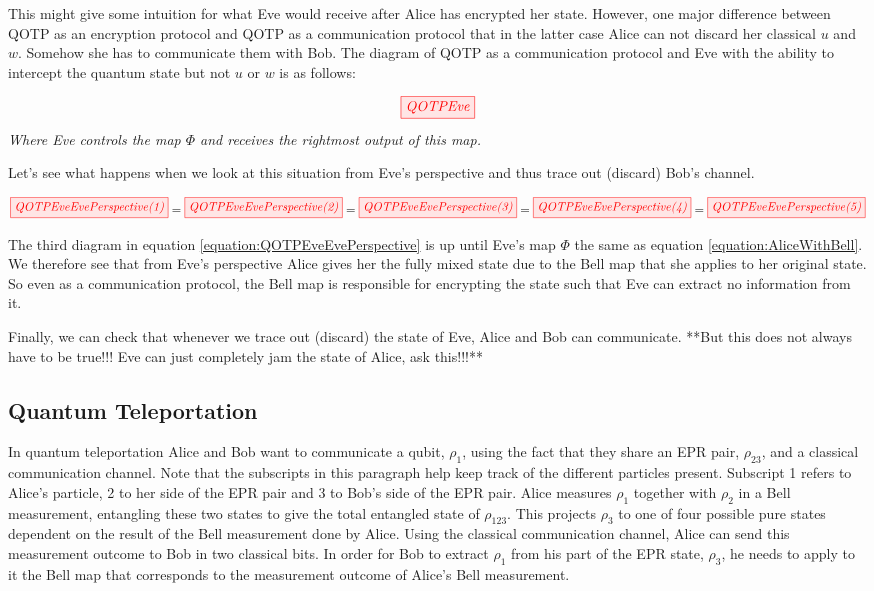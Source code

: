 \documentclass[]{article}
\begin{document}
This might give some intuition for what Eve would receive after Alice has encrypted her state. However, one major difference between QOTP as an encryption protocol and QOTP as a communication protocol that in the latter case Alice can not discard her classical $u$ and $w$. Somehow she has to communicate them with Bob. The diagram of QOTP as a communication protocol and Eve with the ability to intercept the quantum state but not $u$ or $w$ is as follows:

\begin{equation}
	\tikzfig{QOTPEve}
\end{equation}
\textit{Where Eve controls the map $\Phi$ and receives the rightmost output of this map.}

Let's see what happens when we look at this situation from Eve's perspective and thus trace out (discard) Bob's channel.

\begin{equation}
	\label{equation:QOTPEveEvePerspective}
	\tikzfig{QOTPEveEvePerspective(1)} =
	\tikzfig{QOTPEveEvePerspective(2)} =
	\tikzfig{QOTPEveEvePerspective(3)} =
	\tikzfig{QOTPEveEvePerspective(4)} =
	\tikzfig{QOTPEveEvePerspective(5)}
\end{equation}

The third diagram in equation \ref{equation:QOTPEveEvePerspective} is up until Eve's map $\Phi$ the same as equation \ref{equation:AliceWithBell}. We therefore see that from Eve's perspective Alice gives her the fully mixed state due to the Bell map that she applies to her original state. So even as a communication protocol, the Bell map is responsible for encrypting the state such that Eve can extract no information from it. 

Finally, we can check that whenever we trace out (discard) the state of Eve, Alice and Bob can communicate. **But this does not always have to be true!!! Eve can just completely jam the state of Alice, ask this!!!**

\subsection{Quantum Teleportation}

In quantum teleportation Alice and Bob want to communicate a qubit, $\rho_1$, using the fact that they share an EPR pair, $\rho_{23}$, and a classical communication channel. Note that the subscripts in this paragraph help keep track of the different particles present. Subscript 1 refers to Alice's particle, 2 to her side of the EPR pair and 3 to Bob's side of the EPR pair. Alice measures $\rho_1$ together with $\rho_{2}$ in a Bell measurement, entangling these two states to give the total entangled state of $\rho_{123}$. This projects $\rho_{3}$ to one of four possible pure states dependent on the result of the Bell measurement done by Alice. Using the classical communication channel, Alice can send this measurement outcome to Bob in two classical bits. In order for Bob to extract  $\rho_1$ from his part of the EPR state, $\rho_{3}$, he needs to apply to it the Bell map that corresponds to the measurement outcome of Alice's Bell measurement.
\end{document}
